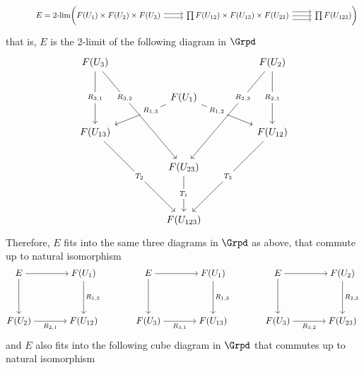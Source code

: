 \begin{answer}
    \[\begin{tikzcd}
    	{} & {E = \text{2-lim} \bigg( F(U_1) \times F(U_2) \times F(U_3)} & {\prod F(U_{12}) \times F(U_{13}) \times F(U_{23})} & {\prod F(U_{123}) \bigg)}
    	\arrow[shift right, from=1-2, to=1-3]
    	\arrow[shift left, from=1-2, to=1-3]
    	\arrow[from=1-3, to=1-4]
    	\arrow[shift left=2, from=1-3, to=1-4]
    	\arrow[shift right=2, from=1-3, to=1-4]
    \end{tikzcd}\]
    that is, $E$ is the 2-limit of the following diagram in $\Grpd$
    \[\begin{tikzcd}
        {F(U_3)} &&&& {F(U_2)} \\
        && {F(U_1)} \\
        {F(U_{13})} &&&& {F(U_{12})} \\
        && {F(U_{23})} \\
        \\
        && {F(U_{123})}
        \arrow["{R_{3,1}}"{description}, from=1-1, to=3-1]
        \arrow["{R_{3,2}}"{description, pos=0.3}, from=1-1, to=4-3]
        \arrow["{R_{2,1}}"{description}, from=1-5, to=3-5]
        \arrow["{R_{2,3}}"{description, pos=0.3}, from=1-5, to=4-3]
        \arrow["{R_{1,3}}"{description, pos=0.3}, from=2-3, to=3-1]
        \arrow["{R_{1,2}}"{description, pos=0.3}, from=2-3, to=3-5]
        \arrow["{T_2}"{description}, from=3-1, to=6-3]
        \arrow["{T_3}"{description}, from=3-5, to=6-3]
        \arrow["{T_1}"{description}, from=4-3, to=6-3]
    \end{tikzcd}\]
    Therefore, $E$ fits into the same three diagrams in $\Grpd$ as above, that commute up to natural isomorphism
    \[\begin{tikzcd}[cramped,column sep=scriptsize]
    	E && {F(U_1)} && E && {F(U_1)} && E && {F(U_2)} \\
    	\\
    	{F(U_2)} && {F(U_{12})} && {F(U_3)} && {F(U_{13})} && {F(U_3)} && {F(U_{23})}
    	\arrow[from=1-1, to=1-3]
    	\arrow[from=1-1, to=3-1]
    	\arrow["{{{R_{1,2}}}}", from=1-3, to=3-3]
    	\arrow[from=1-5, to=1-7]
    	\arrow[from=1-5, to=3-5]
    	\arrow["{{{R_{1,3}}}}", from=1-7, to=3-7]
    	\arrow[from=1-9, to=1-11]
    	\arrow[from=1-9, to=3-9]
    	\arrow["{{{R_{2,3}}}}", from=1-11, to=3-11]
    	\arrow["{{{R_{2,1}}}}"', from=3-1, to=3-3]
    	\arrow["{{{R_{3,1}}}}"', from=3-5, to=3-7]
    	\arrow["{{{R_{3,2}}}}"', from=3-9, to=3-11]
    \end{tikzcd}\]
    and $E$ also fits into the following cube diagram in $\Grpd$ that commutes up to natural isomorphism

\end{answer}
